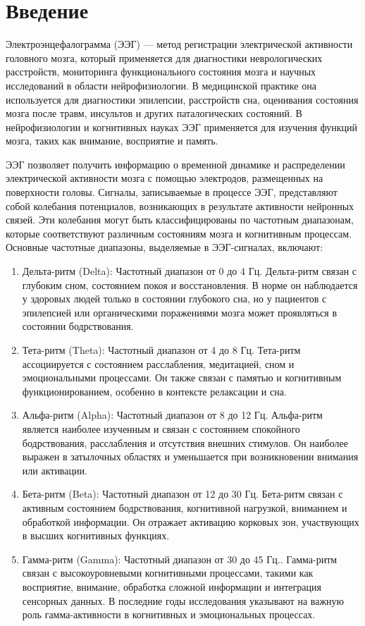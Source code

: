 \chapter*{Введение}
\label{ch:intro}

 Электроэнцефалограмма (ЭЭГ) — метод регистрации электрической активности головного мозга, который применяется для диагностики неврологических расстройств, мониторинга функционального состояния мозга и научных исследований в области нейрофизиологии. В медицинской практике она используется для диагностики эпилепсии, расстройств сна, оценивания состояния мозга после травм, инсультов и других паталогических состояний. В нейрофизиологии и когнитивных науках ЭЭГ применяется для изучения функций мозга, таких как внимание, восприятие и память.

ЭЭГ позволяет получить информацию о временной динамике и распределении электрической активности мозга с помощью электродов, размещенных на поверхности головы. Сигналы, записываемые в процессе ЭЭГ, представляют собой колебания потенциалов, возникающих в результате активности нейронных связей. Эти колебания могут быть классифицированы по частотным диапазонам, которые соответствуют различным состояниям мозга и когнитивным процессам. Основные частотные диапазоны, выделяемые в ЭЭГ-сигналах, включают:
\begin{enumerate}
    \item Дельта-ритм (Delta):
    Частотный диапазон от 0 до 4 Гц. Дельта-ритм связан с глубоким сном, состоянием покоя и восстановления. В норме он наблюдается у здоровых людей только в состоянии глубокого сна, но у пациентов с эпилепсией или органическими поражениями мозга может проявляться в состоянии бодрствования.
    \item Тета-ритм (Theta):
     Частотный диапазон от 4 до 8 Гц. Тета-ритм ассоциируется с состоянием расслабления, медитацией, сном и эмоциональными процессами. Он также связан с памятью и когнитивным функционированием, особенно в контексте релаксации и сна.
    \item Альфа-ритм (Alpha):
    Частотный диапазон от 8 до 12 Гц. Альфа-ритм является наиболее изученным и связан с состоянием спокойного бодрствования, расслабления и отсутствия внешних стимулов. Он наиболее выражен в затылочных областях и уменьшается при возникновении внимания или активации.
    \item Бета-ритм (Beta):
    Частотный диапазон от 12 до 30 Гц. Бета-ритм связан с активным состоянием бодрствования, когнитивной нагрузкой, вниманием и обработкой информации. Он отражает активацию корковых зон, участвующих в высших когнитивных функциях.
    \item Гамма-ритм (Gamma):
    Частотный диапазон от 30 до 45 Гц.. Гамма-ритм связан с высокоуровневыми когнитивными процессами, такими как восприятие, внимание, обработка сложной информации и интеграция сенсорных данных. В последние годы исследования указывают на важную роль гамма-активности в когнитивных и эмоциональных процессах.
\end{enumerate}
